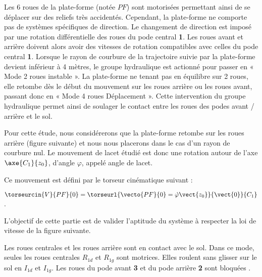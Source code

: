 Les 6 roues de la plate-forme (notée $PF$) sont motorisées permettant ainsi de se déplacer sur des reliefs très
accidentés. Cependant, la plate-forme ne comporte pas de systèmes spécifiques de direction. Le changement de
direction est imposé par une rotation différentielle des roues du pode central \textbf{1}. Les roues avant et arrière doivent alors
avoir des vitesses de rotation compatibles avec celles du pode central \textbf{1}. Lorsque le rayon de courbure de la trajectoire
suivie par la plate-forme devient inférieur à 4 mètres, le groupe hydraulique est actionné pour passer en « Mode 2
roues instable ». La plate-forme ne tenant pas en équilibre sur 2 roues, elle retombe dès le début du mouvement sur
les roues arrière ou les roues avant, passant donc en « Mode 4 roues Déplacement ». Cette intervention du groupe
hydraulique permet ainsi de soulager le contact entre les roues des podes avant / arrière et le sol. 

Pour cette étude, nous considérerons que la plate-forme retombe sur les roues arrière (figure suivante) et nous nous placerons dans le cas d’un rayon de courbure nul. Le mouvement de lacet étudié est donc une rotation autour de l’axe $\axe{C_1}{z_0}$, d’angle  $\varphi$, appelé angle de lacet.


Ce mouvement est défini par le torseur cinématique suivant : 

$\torseurcin{V}{PF}{0}=\torseurl{\vecto{PF}{0}=\dot{\varphi}\vect{z_0}}{\vect{0}}{C_1}$.





L’objectif de cette partie est de valider l’aptitude du système à respecter la
loi de vitesse de la figure suivante.



Les roues centrales et les roues arrière sont en contact avec le sol. Dans ce
mode, seules les roues centrales $R_{1d}$ et $R_{1g}$ sont motrices. Elles roulent
sans glisser sur le sol en $I_{1d}$ et $I_{1g}$. Les roues du pode avant \textbf{3} et du pode
arrière \textbf{2} sont bloquées .


